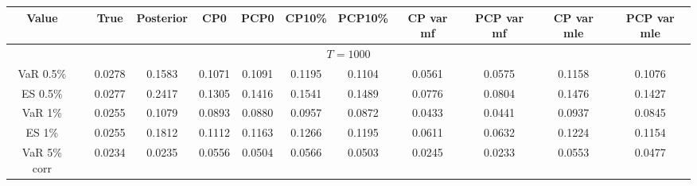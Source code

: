 { \tiny 
{ \renewcommand{\arraystretch}{1.1} 
\begin{sidewaystable} 
\center 
\begin{tabular}{cc cc | cccc | cccc} 
Value && True & Posterior & CP0  & PCP0 & CP10\%  & PCP10\% &CP var mf & PCP var mf & CP var mle & PCP var mle \\ \hline 
\hline 
\multicolumn{12}{c}{$T =1000$}  \\ 
\hline 
VaR 0.5\% 
 && 0.0278 & 0.1583 & 0.1071 & 0.1091 & 0.1195 & 0.1104 &0.0561 & 0.0575 & 0.1158 & 0.1076 \\ 
ES 0.5\% 
 && 0.0277 & 0.2417 & 0.1305 & 0.1416 & 0.1541 & 0.1489 &0.0776 & 0.0804 & 0.1476 & 0.1427 \\ 
\rowcolor{LightCyan} 
VaR 1\% 
 && 0.0255 & 0.1079 & 0.0893 & 0.0880 & 0.0957 & 0.0872 &0.0433 & 0.0441 & 0.0937 & 0.0845 \\ 
\rowcolor{LightCyan} 
ES 1\% 
 && 0.0255 & 0.1812 & 0.1112 & 0.1163 & 0.1266 & 0.1195 &0.0611 & 0.0632 & 0.1224 & 0.1154 \\ 
VaR 5\% corr && 0.0234 & 0.0235 & 0.0556 & 0.0504 & 0.0566 & 0.0503 &0.0245 & 0.0233 & 0.0553 & 0.0477 \\ 

\end{tabular}
\end{sidewaystable}}}
